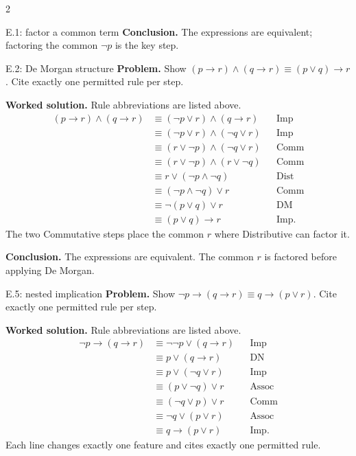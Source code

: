 \documentclass[10pt]{article}
\begin{document}
\begin{multicols}{2}
\begin{workedbox}{E.1: factor a common term}
\textbf{Conclusion.} The expressions are equivalent; factoring the common $\neg p$ is the key step.
\end{workedbox}


\begin{workedbox}{E.2: De Morgan structure}
\textbf{Problem.} Show $(p\to r)\land(q\to r)\equiv(p\lor q)\to r$. Cite exactly one permitted rule per step.

\textbf{Worked solution.} Rule abbreviations are listed above.
\begin{align*}
(p\to r)\land(q\to r)
&\equiv(\neg p\lor r)\land(q\to r) &&\text{Imp}\\
&\equiv(\neg p\lor r)\land(\neg q\lor r) &&\text{Imp}\\
&\equiv(r\lor\neg p)\land(\neg q\lor r) &&\text{Comm}\\
&\equiv(r\lor\neg p)\land(r\lor\neg q) &&\text{Comm}\\
&\equiv r\lor(\neg p\land\neg q) &&\text{Dist}\\
&\equiv(\neg p\land\neg q)\lor r &&\text{Comm}\\
&\equiv\neg(p\lor q)\lor r &&\text{DM}\\
&\equiv(p\lor q)\to r &&\text{Imp}.
\end{align*}
The two Commutative steps place the common $r$ where Distributive can factor it.

\textbf{Conclusion.} The expressions are equivalent. The common $r$ is factored before applying De Morgan.
\end{workedbox}

\begin{workedbox}{E.5: nested implication}
\textbf{Problem.} Show $\neg p\to(q\to r)\equiv q\to(p\lor r)$. Cite exactly one permitted rule per step.

\textbf{Worked solution.} Rule abbreviations are listed above.
\begin{align*}
\neg p\to(q\to r)
&\equiv\neg\neg p\lor(q\to r) &&\text{Imp}\\
&\equiv p\lor(q\to r) &&\text{DN}\\
&\equiv p\lor(\neg q\lor r) &&\text{Imp}\\
&\equiv(p\lor\neg q)\lor r &&\text{Assoc}\\
&\equiv(\neg q\lor p)\lor r &&\text{Comm}\\
&\equiv\neg q\lor(p\lor r) &&\text{Assoc}\\
&\equiv q\to(p\lor r) &&\text{Imp}.
\end{align*}
Each line changes exactly one feature and cites exactly one permitted rule.


\end{workedbox}
\end{multicols}
\end{document}
